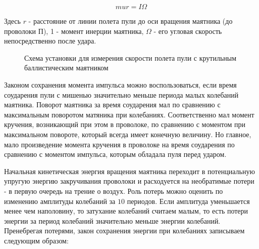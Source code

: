 \documentclass[14pt]{article}
\begin{document}
\begin{equation}
mur = I\Omega
\end{equation}

\noindent Здесь $r$ - расстояние от линии полета пули до оси вращения маятника (до проволоки $\text{П}$), 1 - момент инерции маятника, $\Omega$ - его угловая скорость непосредственно после удара.

\begin{figure}[h!]
	\caption{Схема установки для измерения скорости полета пули с крутильным баллистическим маятником}
\end{figure} 

Законом сохранения момента импульса можно воспользоваться, если время соударения пули с мишенью значительно меньше периода малых колебаний маятника. Поворот маятника за время соударения мал по сравнению с максимальным поворотом матяника при колебаниях. Соответственно мал момент кручения, возникающий при этом в проволоке, по сравнению с моментом при максимальном повороте, который всегда имеет конечную величину. Но главное, мало произведение момента кручения в проволоке на время соударения по сравнению с моментом импульса, которым обладала пуля перед ударом.

Начальная кинетическая энергия вращения маятника переходит в потенциальную упругую энергию закручивания проволоки и расходуется на необратимые потери - в первую очередь на трение о воздух. Роль потерь можно оценить по изменению амплитуды колебаний за $10$ периодов. Если амплитуда уменьшается менее чем наполовину, то затухание колебаний считаем малым, то есть потери энергии за период колебаний значительно меньше энергии колебаний. Пренебрегая потерями, закон сохранения энергии при колебаниях записываем следующим образом:
\end{document}
